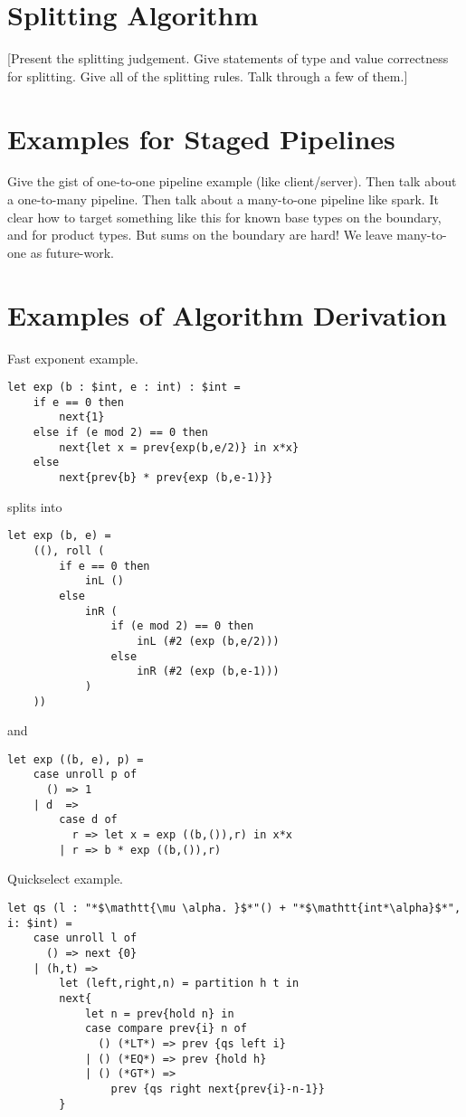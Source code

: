 
\section{Splitting Algorithm}

[Present the splitting judgement.  Give statements of type and value correctness for splitting.  Give all of the splitting rules.  Talk through a few of them.]

\section{Examples for Staged Pipelines}

Give the gist of one-to-one pipeline example (like client/server).
Then talk about a one-to-many pipeline.
Then talk about a many-to-one pipeline like spark.  It clear how to target something like this for known base types on the boundary, and for product types.  But sums on the boundary are hard!  We leave many-to-one as future-work.


\section{Examples of Algorithm Derivation}

Fast exponent example.  

\begin{lstlisting} 
let exp (b : $int, e : int) : $int =
	if e == 0 then
		next{1}
	else if (e mod 2) == 0 then
		next{let x = prev{exp(b,e/2)} in x*x}
	else
		next{prev{b} * prev{exp (b,e-1)}}		
\end{lstlisting}

splits into

\begin{lstlisting} 
let exp (b, e) =
	((), roll (
		if e == 0 then
			inL ()
		else 
			inR (
				if (e mod 2) == 0 then
					inL (#2 (exp (b,e/2)))
				else
					inR (#2 (exp (b,e-1)))
			)
	))
\end{lstlisting}

and

\begin{lstlisting} 
let exp ((b, e), p) =
	case unroll p of
	  () => 1
	| d  =>
		case d of
		  r => let x = exp ((b,()),r) in x*x
		| r => b * exp ((b,()),r)
\end{lstlisting}

Quickselect example.

\begin{lstlisting} 
let qs (l : "*$\mathtt{\mu \alpha. }$*"() + "*$\mathtt{int*\alpha}$*", i: $int) = 
	case unroll l of
	  () => next {0}
	| (h,t) => 
		let (left,right,n) = partition h t in
		next{
			let n = prev{hold n} in
			case compare prev{i} n of
			  () (*LT*) => prev {qs left i}
			| () (*EQ*) => prev {hold h}
			| () (*GT*) => 
				prev {qs right next{prev{i}-n-1}}
		}	
\end{lstlisting}

